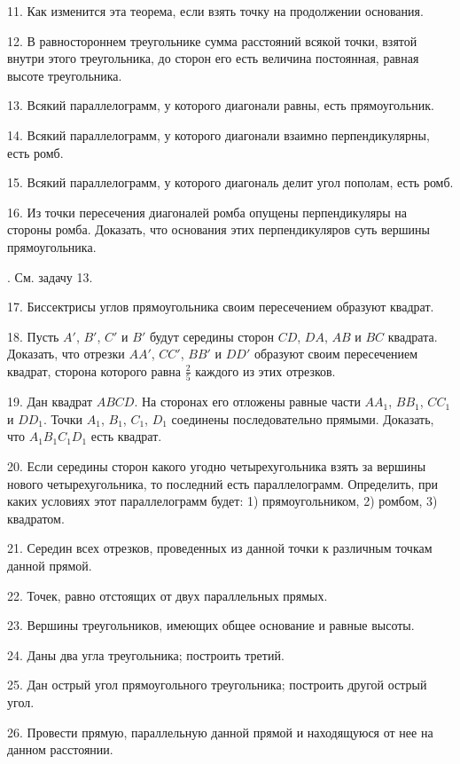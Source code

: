 \documentclass[oneside]{book}
\begin{document}
11.
Как изменится эта теорема, если взять точку на продолжении основания.

12.
В равностороннем треугольнике сумма расстояний всякой точки, взятой внутри этого треугольника, до сторон его есть величина постоянная, равная высоте треугольника.

13.
Всякий параллелограмм, у которого диагонали равны, есть прямоугольник.

14.
Всякий параллелограмм, у которого диагонали взаимно перпендикулярны, есть ромб.

15.
Всякий параллелограмм, у которого диагональ делит угол пополам, есть ромб.

16.
Из точки пересечения диагоналей ромба опущены перпендикуляры на стороны ромба.
Доказать, что основания этих перпендикуляров суть вершины прямоугольника.

.
См.
задачу 13.

17.
Биссектрисы углов прямоугольника своим пересечением образуют квадрат.

18.
Пусть $A'$, $B'$, $C'$ и $B'$ будут середины сторон $CD$, $DA$, $AB$ и $BC$ квадрата.
Доказать, что отрезки $AA'$, $CC'$, $BB'$ и $DD'$ образуют своим пересечением квадрат, сторона которого равна $\tfrac25$ каждого из этих отрезков.

19.
Дан квадрат $ABCD$.
На сторонах его отложены равные части $AA_1$, $BB_1$, $CC_1$ и $DD_1$.
Точки $A_1$, $B_1$, $C_1$, $D_1$ соединены последовательно прямыми.
Доказать, что $A_1B_1C_1D_1$ есть квадрат.

20.
Если середины сторон какого угодно четырехугольника взять за вершины нового четырехугольника, то последний есть параллелограмм.
Определить, при каких условиях этот параллелограмм будет:
1) прямоугольником, 2) ромбом, 3) квадратом.


21.
Середин всех отрезков, проведенных из данной точки к различным точкам данной прямой.

22.
Точек, равно отстоящих от двух параллельных прямых.

23.
Вершины треугольников, имеющих общее основание и равные высоты.


24.
Даны два угла треугольника;
построить третий.

25.
Дан острый угол прямоугольного треугольника;
построить другой острый угол.

26.
Провести прямую, параллельную данной прямой и находящуюся от нее на данном расстоянии.
\end{document}
